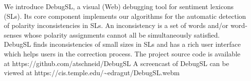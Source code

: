We introduce DebugSL, a visual (Web) debugging tool for sentiment lexicons (SLs). Its core component implements our algorithms for the automatic detection of polarity inconsistencies in SLs. An inconsistency is a set of words and/or word-senses whose polarity assignments cannot all be simultaneously satisfied. DebugSL finds inconsistencies of small sizes in SLs and has a rich user interface which helps users in the correction process. The project source code is available at https://github.com/atschneid/DebugSL A screencast of DebugSL can be viewed at https://cis.temple.edu/{\textasciitilde}edragut/DebugSL.webm
